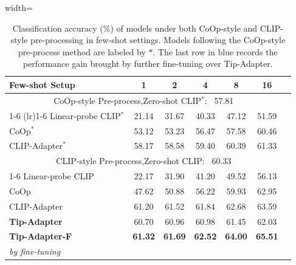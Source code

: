 \documentclass[10pt,twocolumn,letterpaper]{article}
\begin{document}
\begin{table}[t]
\centering
\vspace*{13pt}
\begin{adjustbox}{width=\linewidth}
	\begin{tabular}{lcccccc}
	\toprule
		Few-shot Setup & 1    & 2  & 4  & 8 & 16 \\ \midrule
		\multicolumn{6}{c}{CoOp-style Pre-process,\quad Zero-shot CLIP$^{*}$\cite{radford2021learning}: \ 57.81} \\  \cmidrule(lr){1-6}
	   \cmidrule(lr){1-6}
		Linear-probe CLIP$^{*}$\cite{radford2021learning}  &21.14 &31.67 &40.33 &47.12 &51.59\\
		CoOp$^{*}$\cite{zhou2021coop}  &53.12 &53.23 &56.47 &57.58 &60.46 \\
	    CLIP-Adapter$^{*}$\cite{gao2021clip}  &58.17  &58.58  &59.40  &60.39 &61.33 \\ \midrule
	    \multicolumn{6}{c}{CLIP-style Pre-process,\quad Zero-shot CLIP\cite{radford2021learning}: \ 60.33} \\  \cmidrule(lr){1-6}
	    Linear-probe CLIP\cite{radford2021learning}  &22.17 &31.90 &41.20 &49.52 &56.13\\
		CoOp\cite{zhou2021coop}  &47.62 &50.88 &56.22 &59.93 &62.95 \\
	    CLIP-Adapter\cite{gao2021clip}  &61.20  & 61.52 &  61.84 &  62.68 &  63.59 \\
	    \textbf{Tip-Adapter}  &60.70   &60.96   &60.98   &61.45   &62.03 \\
	    \textbf{Tip-Adapter-F}  &\textbf{61.32}   &\textbf{61.69}   &\textbf{62.52} &\textbf{64.00}   &\textbf{65.51}  \\
	    \emph{by fine-tuning} &\color{blue}{+0.62} &\color{blue}{+0.73} &\color{blue}{+1.54} &\color{blue}{+2.55} &\color{blue}{+3.48} \\
	\bottomrule
	\end{tabular}
\end{adjustbox}
\caption{Classification accuracy ($\%$) of models under both CoOp-style and CLIP-style pre-processing in few-shot settings. Models following the CoOp-style pre-process method are labeled by $*$. The last row in blue records the performance gain brought by further fine-tuning over Tip-Adapter.}
\vspace*{-16pt}
\label{imagenett}
\end{table}
\end{document}
